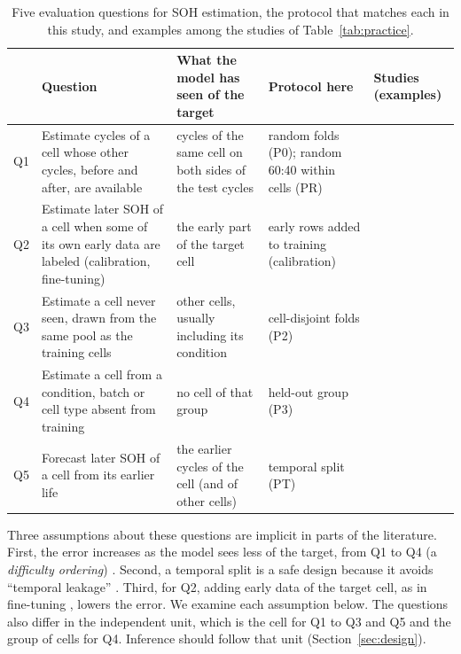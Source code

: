 \documentclass{ieeeaccess}
\begin{document}
\begin{table}[!t]
\centering
\caption{Five evaluation questions for SOH estimation, the protocol that matches each in this study, and examples among the studies of Table~\ref{tab:practice}.}
\label{tab:questions}
\footnotesize
\begin{tabular}{p{}p{}p{}p{}p{}}
\toprule
 & Question & What the model has seen of the target & Protocol here & Studies (examples) \\
\midrule
Q1 & Estimate cycles of a cell whose other cycles, before and after, are available & cycles of the same cell on both sides of the test cycles & random folds (P0); random 60:40 within cells (PR) & \cite{aud40,aud43,aud17} \\
Q2 & Estimate later SOH of a cell when some of its own early data are labeled (calibration, fine-tuning) & the early part of the target cell & early rows added to training (calibration) & \cite{aud25,aud49} \\
Q3 & Estimate a cell never seen, drawn from the same pool as the training cells & other cells, usually including its condition & cell-disjoint folds (P2) & \cite{aud47,aud42,aud30,aud53} \\
Q4 & Estimate a cell from a condition, batch or cell type absent from training & no cell of that group & held-out group (P3) & \cite{aud31,aud45,aud01} \\
Q5 & Forecast later SOH of a cell from its earlier life & the earlier cycles of the cell (and of other cells) & temporal split (PT) & \cite{aud04,aud09,aud10,aud12,aud38,aud41} \\
\bottomrule
\end{tabular}
\end{table}

Three assumptions about these questions are implicit in parts of the literature. First, the error increases as the model sees less of the target, from Q1 to Q4 (a \emph{difficulty ordering}) \cite{saeb2017,le2026,barua2026,maher2025}. Second, a temporal split is a safe design because it avoids ``temporal leakage'' \cite{kapoor2023}. Third, for Q2, adding early data of the target cell, as in fine-tuning \cite{aud25,aud49}, lowers the error. We examine each assumption below. The questions also differ in the independent unit, which is the cell for Q1 to Q3 and Q5 and the group of cells for Q4. Inference should follow that unit (Section~\ref{sec:design}).
\end{document}
